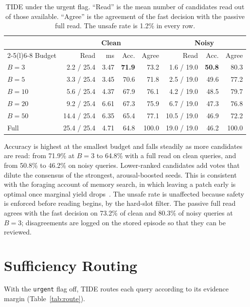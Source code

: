 \documentclass[12pt,a4paper,oneside]{report}
\newcommand{\code}[1]{\texttt{\small #1}}
\begin{document}
\begin{table}[H]
\centering
\caption{TIDE under the urgent flag. ``Read'' is the mean number of candidates read out of those available. ``Agree'' is the agreement of the fast decision with the passive full read. The unsafe rate is 1.2\% in every row.}
\label{tab:tide}
\small
\begin{tabular}{@{}l rrrr rrr@{}}
\toprule
& \multicolumn{4}{c}{Clean} & \multicolumn{3}{c}{Noisy}\\
\cmidrule(lr){2-5}\cmidrule(l){6-8}
Budget & Read & ms & Acc. & Agree & Read & Acc. & Agree\\
\midrule
$B=3$ & 2.2 / 25.4 & 3.47 & \textbf{71.9} & 73.2 & 1.6 / 19.0 & \textbf{50.8} & 80.3\\
$B=5$ & 3.3 / 25.4 & 3.45 & 70.6 & 71.8 & 2.5 / 19.0 & 49.6 & 77.2\\
$B=10$ & 5.6 / 25.4 & 4.37 & 67.9 & 76.1 & 4.2 / 19.0 & 48.5 & 79.7\\
$B=20$ & 9.2 / 25.4 & 6.61 & 67.3 & 75.9 & 6.7 / 19.0 & 47.3 & 76.8\\
$B=50$ & 14.4 / 25.4 & 6.35 & 65.4 & 77.1 & 10.5 / 19.0 & 46.9 & 72.2\\
Full & 25.4 / 25.4 & 4.71 & 64.8 & 100.0 & 19.0 / 19.0 & 46.2 & 100.0\\
\bottomrule
\end{tabular}
\end{table}

Accuracy is highest at the smallest budget and falls steadily as more candidates are read: from 71.9\% at $B=3$ to 64.8\% with a full read on clean queries, and from 50.8\% to 46.2\% on noisy queries. Lower-ranked candidates add votes that dilute the consensus of the strongest, arousal-boosted seeds. This is consistent with the foraging account of memory search, in which leaving a patch early is optimal once marginal yield drops~\cite{hills2012}. The unsafe rate is unaffected because safety is enforced before reading begins, by the hard-slot filter. The passive full read agrees with the fast decision on 73.2\% of clean and 80.3\% of noisy queries at $B=3$; disagreements are logged on the stored episode so that they can be reviewed.

\section{Sufficiency Routing}
With the \code{urgent} flag off, TIDE routes each query according to its evidence margin (Table~\ref{tab:route}).
\end{document}
